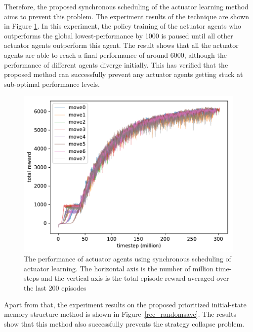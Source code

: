 Therefore, the proposed synchronous scheduling of the actuator learning method aims to prevent this problem. The experiment results of the technique are shown in Figure \ref{rec_sync_training}. In this experiment, the policy training of the actuator agents who outperforms the global lowest-performance by 1000 is paused until all other actuator agents outperform this agent. The result shows that all the actuator agents are able to reach a final performance of around 6000, although the performance of different agents diverge initially. This has verified that the proposed method can successfully prevent any actuator agents getting stuck at sub-optimal performance levels. 

\begin{figure}[!htbp]
	\includegraphics[width=\textwidth]{images/rec_180619_sync.pdf}
	\centering
	\caption{The performance of actuator agents using synchronous scheduling of actuator learning. The horizontal axis is the number of million time-steps and the vertical axis is the total episode reward averaged over the last 200 episodes}\label{rec_sync_training}
\end{figure}
Apart from that, the experiment results on the proposed prioritized initial-state memory structure method is shown in Figure~\ref{rec_randomsave}. The results show that this method also successfully prevents the strategy collapse problem.
